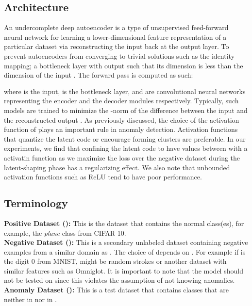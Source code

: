 \documentclass[acmtog, nonacm]{acmart}
\begin{document}
\subsection{Architecture}
An undercomplete deep autoencoder is a type of unsupervised feed-forward neural network for learning a lower-dimensional feature representation of a particular dataset via reconstructing the input back at the output layer. To prevent autoencoders from converging to trivial solutions such as the identity mapping; a bottleneck layer with output  such that its dimension is less than the dimension of the input . The forward pass is computed as such:



where  is the input,  is the bottleneck layer,  and  are convolutional neural networks representing the encoder and the decoder modules respectively. Typically, such models are trained to minimize the -norm of the difference between the input and the reconstructed output .
As previously discussed, the choice of the activation function of  plays an important rule in anomaly detection. Activation functions that quantize the latent code or encourage forming clusters are preferable. In our experiments, we find that confining the latent code to have values between  with a  activatin function as we maximize the loss over the negative dataset during the latent-shaping phase has a regularizing effect. We also note that unbounded activation functions such as ReLU tend to have poor performance.

\subsection{Terminology}



\textbf{Positive Dataset ():} This is the dataset that contains the normal class(es), for example, the \textit{plane} class from CIFAR-10.\\
\textbf{Negative Dataset ():} This is a secondary unlabeled dataset containing negative examples from a similar domain as . The choice of  depends on . For example if  is the digit 0 from MNIST,   might be random strokes or another dataset with similar features such as Omniglot\cite{tang2017vehicle}. It is important to note that the model should not be tested on   since this violates the assumption of not knowing anomalies.\\
\textbf{Anomaly Dataset ():} This is a test dataset that contains classes that are neither in  nor in .
\end{document}
